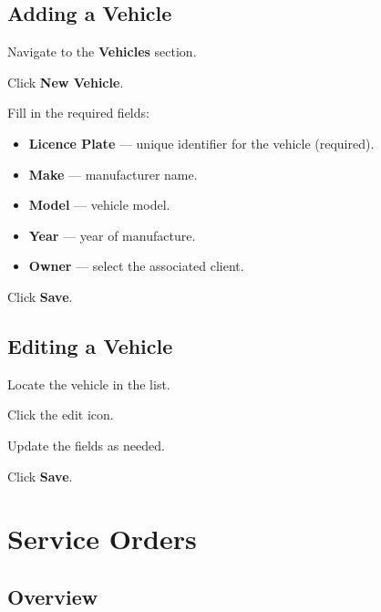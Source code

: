 \documentclass[12pt, a4paper]{report}
\newcommand{\ui}[1]{\textbf{\color{Navy}#1}}
\begin{document}
	\section{Adding a Vehicle}
	
	\begin{steps}
		\item Navigate to the \ui{Vehicles} section.
		\item Click \ui{New Vehicle}.
		\item Fill in the required fields:
		\begin{itemize}
			\item \ui{Licence Plate} --- unique identifier for the vehicle (required).
			\item \ui{Make} --- manufacturer name.
			\item \ui{Model} --- vehicle model.
			\item \ui{Year} --- year of manufacture.
			\item \ui{Owner} --- select the associated client.
		\end{itemize}
		\item Click \ui{Save}.
	\end{steps}
	
	\section{Editing a Vehicle}
	
	\begin{steps}
		\item Locate the vehicle in the list.
		\item Click the edit icon.
		\item Update the fields as needed.
		\item Click \ui{Save}.
	\end{steps}
	
	\chapter{Service Orders}
	
	\section{Overview}
	
\end{document}
